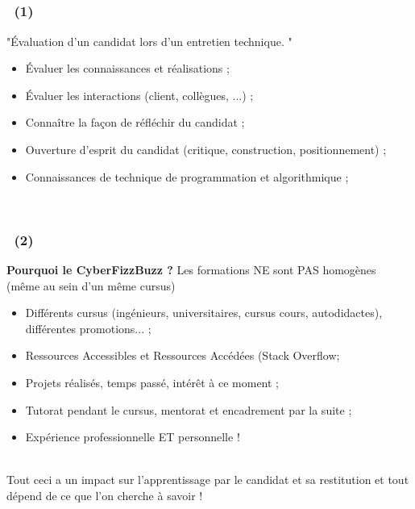 \documentclass{beamer}
\begin{document}
\subsection{\titleTentativeDefinitionCyberFizzBuzz }
\begin{frame}
	\frametitle{\titleTentativeDefinitionCyberFizzBuzz ~(1)}
	
	"{\'E}valuation d'un candidat lors d'un entretien technique. "~\\
	
	\begin{itemize}
		\item {\'E}valuer les connaissances et r{\'e}alisations ; 
		\item {\'E}valuer les interactions (client, coll{\`e}gues, ...) ; 
		\item Conna{\^i}tre la fa\c{c}on de r{\'e}fl{\'e}chir du candidat ; 
		\item Ouverture d'esprit du candidat (critique, construction, positionnement) ; 
		\item Connaissances de technique de programmation et algorithmique ; 
	\end{itemize}~\\
	
\end{frame}

\begin{frame}
	\frametitle{\titleTentativeDefinitionCyberFizzBuzz ~(2)}
	
	\textbf{Pourquoi le CyberFizzBuzz ?} Les formations NE sont PAS homog{\`e}nes (m{\^e}me au sein d'un m{\^e}me cursus)~\\
	
	\begin{itemize}
		\item Diff{\'e}rents cursus (ing{\'e}nieurs, universitaires, cursus cours, autodidactes), diff{\'e}rentes promotions... ;  
		\item Ressources Accessibles et Ressources Acc{\'e}d{\'e}es (Stack Overflow; 
		\item Projets r{\'e}alis{\'e}s, temps pass{\'e}, int{\'e}r{\^e}t {\`a} ce moment ; 
		\item Tutorat pendant le cursus, mentorat et encadrement par la suite ; 
		\item Exp{\'e}rience professionnelle ET personnelle !
	\end{itemize}~\\
	
	Tout ceci a un impact sur l'apprentissage par le candidat et sa restitution et tout d{\'e}pend de ce que l'on cherche {\`a} savoir !
\end{frame}
\end{document}
